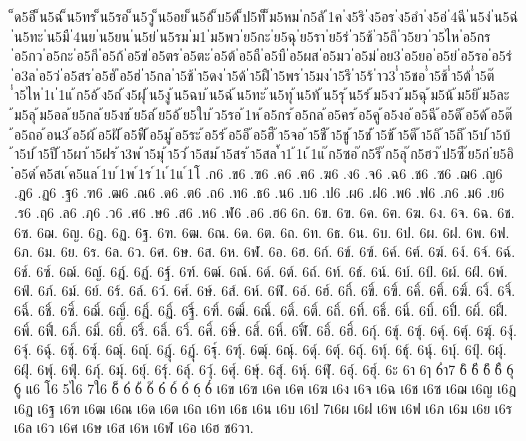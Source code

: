 {็ด5อึ
็น5ฉ่
็น5ทร
็น5รอ
็น5วู
็น5อย
็น5อ้
็บ5ด้
็ป5ท็
็ม5หม
่ก5ลั
่1ค
่ง5ริ
่ง5อร
่ง5อำ
่ง5อ่
่4ฉี
่น5ง่
่น5ฉ่
่น5ทะ
่น5มื
่4นย
่น5ยน
่น5ย่
่น5รม
่ม1
่ม5พว
่ย5กะ
่ย5ฉุ
่ย5รา
่ย5ร่
่ว5ช้
่ว5ถึ
่ว5ยว
่ว5ไห
่อ5กร
่อ5กว
่อ5กะ
่อ5กี
่อ5ก้
่อ5ข่
่อ5ตร
่อ5ตะ
่อ5ต้
่อ5ถื
่อ5บื
่อ5ผส
่อ5มว
่อ5ม่
่อย3
่อ5ยอ
่อ5ย่
่อ5รอ
่อ5ร่
่อ3ล
่อ5ว่
่อ5สร
่อ5ฮั
่อ5ฮ่
่า5กล
่า5ช้
่า5ดง
่า5ด้
่า5ฝื
่า5พร
่า5มง
่า5รึ
่า5ร้
่าว3
่ำ5ชอ
่ำ5ช้
่ำ5ต้
่ำ5ต๊
่ำ5ไห
่1เ
่1แ
้ก5อ้
้ง5ถ่
้ง5ฝุ
้น5งู
้น5ฉบ
้น5ฉ่
้น5ทะ
้น5ทุ
้น5ท้
้น5รุ
้น5ร่
้ม5งว
้ม5ฉุ
้ม5น้
้ม5ยิ
้ม5ละ
้ม5ลุ
้ม5อล
้ย5กล
้ย5งช
้ย5ล่
้ย5อ้
้ย5ใบ
้ว5รอ
้1ห
้อ5กร
้อ5กล
้อ5คร
้อ5คู
้อ5งอ
้อ5ฉี
้อ5ดึ
้อ5ด้
้อ5ต๊
้อ5ถอ
้อน3
้อ5ผ้
้อ5ฝั
้อ5ฟื
้อ5มู
้อ5ระ
้อ5ร่
้อ5อึ
้อ5ฮื
้า5จอ
้า5ชื
้า5ชู
้า5ช่
้า5ช้
้า5ดี
้า5ถิ
้า5ถึ
้า5บ่
้า5บ้
้า5บ๋
้า5ปี
้า5ผา
้า5ฝร
้า3พ
้า5มุ
้า5ว่
้า5สม
้า5สร
้า5สล
้ำ1
้1เ
้1แ
๊ก5ซอ
๊ก5ริ
๊ก5ลุ
๊ก5ฮว
๊ป5ซี
๊ย5ก่
๋ย5อิ
๋อ5ด๋
์ค5สเ
์ค5แล
์1บ
์1พ
์1ร
์1เ
์1แ
์1โ
.ก6
.ข6
.ฃ6
.ค6
.ฅ6
.ฆ6
.ง6
.จ6
.ฉ6
.ช6
.ซ6
.ฌ6
.ญ6
.ฎ6
.ฏ6
.ฐ6
.ฑ6
.ฒ6
.ณ6
.ด6
.ต6
.ถ6
.ท6
.ธ6
.น6
.บ6
.ป6
.ผ6
.ฝ6
.พ6
.ฟ6
.ภ6
.ม6
.ย6
.ร6
.ฤ6
.ล6
.ฦ6
.ว6
.ศ6
.ษ6
.ส6
.ห6
.ฬ6
.อ6
.ฮ6
6ก.
6ข.
6ฃ.
6ค.
6ฅ.
6ฆ.
6ง.
6จ.
6ฉ.
6ช.
6ซ.
6ฌ.
6ญ.
6ฎ.
6ฏ.
6ฐ.
6ฑ.
6ฒ.
6ณ.
6ด.
6ต.
6ถ.
6ท.
6ธ.
6น.
6บ.
6ป.
6ผ.
6ฝ.
6พ.
6ฟ.
6ภ.
6ม.
6ย.
6ร.
6ล.
6ว.
6ศ.
6ษ.
6ส.
6ห.
6ฬ.
6อ.
6ฮ.
6ก์.
6ข์.
6ฃ์.
6ค์.
6ฅ์.
6ฆ์.
6ง์.
6จ์.
6ฉ์.
6ช์.
6ซ์.
6ฌ์.
6ญ์.
6ฎ์.
6ฏ์.
6ฐ์.
6ฑ์.
6ฒ์.
6ณ์.
6ด์.
6ต์.
6ถ์.
6ท์.
6ธ์.
6น์.
6บ์.
6ป์.
6ผ์.
6ฝ์.
6พ์.
6ฟ์.
6ภ์.
6ม์.
6ย์.
6ร์.
6ล์.
6ว์.
6ศ์.
6ษ์.
6ส์.
6ห์.
6ฬ์.
6อ์.
6ฮ์.
6กิ์.
6ขิ์.
6ฃิ์.
6คิ์.
6ฅิ์.
6ฆิ์.
6งิ์.
6จิ์.
6ฉิ์.
6ชิ์.
6ซิ์.
6ฌิ์.
6ญิ์.
6ฎิ์.
6ฏิ์.
6ฐิ์.
6ฑิ์.
6ฒิ์.
6ณิ์.
6ดิ์.
6ติ์.
6ถิ์.
6ทิ์.
6ธิ์.
6นิ์.
6บิ์.
6ปิ์.
6ผิ์.
6ฝิ์.
6พิ์.
6ฟิ์.
6ภิ์.
6มิ์.
6ยิ์.
6ริ์.
6ลิ์.
6วิ์.
6ศิ์.
6ษิ์.
6สิ์.
6หิ์.
6ฬิ์.
6อิ์.
6ฮิ์.
6กุ์.
6ขุ์.
6ฃุ์.
6คุ์.
6ฅุ์.
6ฆุ์.
6งุ์.
6จุ์.
6ฉุ์.
6ชุ์.
6ซุ์.
6ฌุ์.
6ญุ์.
6ฎุ์.
6ฏุ์.
6ฐุ์.
6ฑุ์.
6ฒุ์.
6ณุ์.
6ดุ์.
6ตุ์.
6ถุ์.
6ทุ์.
6ธุ์.
6นุ์.
6บุ์.
6ปุ์.
6ผุ์.
6ฝุ์.
6พุ์.
6ฟุ์.
6ภุ์.
6มุ์.
6ยุ์.
6รุ์.
6ลุ์.
6วุ์.
6ศุ์.
6ษุ์.
6สุ์.
6หุ์.
6ฬุ์.
6อุ์.
6ฮุ์.
6ะ
6า
6ๅ
6ำ7
6ิ
6ี
6ึ
6ื
6ุ
6ู
แ6
โ6
5ไ6
7ใ6
6็
6่
6้
6๊
6๋
6์
6ํ
6ฺ
6๎
เ6ข
เ6ฃ
เ6ค
เ6ฅ
เ6ฆ
เ6ง
เ6จ
เ6ฉ
เ6ช
เ6ซ
เ6ฌ
เ6ญ
เ6ฎ
เ6ฏ
เ6ฐ
เ6ฑ
เ6ฒ
เ6ณ
เ6ด
เ6ต
เ6ถ
เ6ท
เ6ธ
เ6น
เ6บ
เ6ป
7เ6ผ
เ6ฝ
เ6พ
เ6ฟ
เ6ภ
เ6ม
เ6ย
เ6ร
เ6ล
เ6ว
เ6ศ
เ6ษ
เ6ส
เ6ห
เ6ฬ
เ6อ
เ6ฮ
ช6วา.
}
